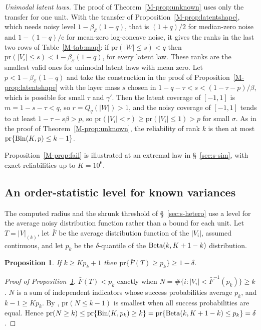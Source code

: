 \documentclass[11pt]{article}
\renewcommand{\_}{\usc\allowbreak}
\newtheorem{proposition}{Proposition}
\newcommand{\pr}{\mathrm{pr}}
\begin{document}
\emph{Unimodal latent laws.} The proof of Theorem~\ref{M-prop:unknown} uses only the transfer for one unit. With the transfer of Proposition~\ref{M-prop:latentshape}, which needs noisy level $1 - \beta_{\mathcal E}(1 - q)$, that is $(1 + q)/2$ for median-zero noise and $1 - (1 - q)/\mathrm{e}$ for mean-zero log-concave noise, it gives the ranks in the last two rows of Table~\ref{M-tab:map}: if $\pr(|W| \le s) < q$ then $\pr(|V_i| \le s) < 1 - \beta_{\mathcal E}(1 - q)$, for every latent law. These ranks are the smallest valid ones for unimodal latent laws with mean zero. Let $p < 1 - \beta_{\mathcal E}(1 - q)$ and take the construction in the proof of Proposition~\ref{M-prop:latentshape} with the layer mass $s$ chosen in $1 - q - \tau < s < (1 - \tau - p)/\beta$, which is possible for small $\tau$ and $\gamma'$. Then the latent coverage of $[-1, 1]$ is $m = 1 - s - \tau < q$, so $r = Q_q(|W|) > 1$, and the noisy coverage of $[-1, 1]$ tends to at least $1 - \tau - s\beta > p$, so $\pr(|V_i| < r) \ge \pr(|V_i| \le 1) > p$ for small $\sigma$. As in the proof of Theorem~\ref{M-prop:unknown}, the reliability of rank $k$ is then at most $\pr\{{\rm Bin}(K, p) \le k - 1\}$.

Proposition~\ref{M-prop:fail} is illustrated at an extremal law in \S~\ref{sec:s-sim}, with exact reliabilities up to $K = 10^6$.

\subsection*{An order-statistic level for known variances}

The computed radius and the shrunk threshold of \S~\ref{sec:s-hetero} use a level for the average noisy distribution function rather than a bound for each unit. Let $T = |V|_{(k)}$, let $\bar F$ be the average distribution function of the $|V_i|$, assumed continuous, and let $p_k$ be the $\delta$-quantile of the ${\rm Beta}(k, K+1-k)$ distribution.

\begin{proposition}\label{prop:beta}
If $k \ge Kp_k + 1$ then $\pr\{\bar F(T) \ge p_k\} \ge 1 - \delta$.
\end{proposition}

\begin{proof}[Proof of Proposition~\ref{prop:beta}]
$\bar F(T) < p_k$ exactly when $N = \#\{i : |V_i| < \bar F^{-1}(p_k)\} \ge k$. $N$ is a sum of independent indicators whose success probabilities average $p_k$, and $k - 1 \ge Kp_k$. By \citet{hoeffding1956}, $\pr(N \le k-1)$ is smallest when all success probabilities are equal. Hence $\pr(N \ge k) \le \pr\{{\rm Bin}(K, p_k) \ge k\} = \pr\{{\rm Beta}(k, K+1-k) \le p_k\} = \delta$.
\end{proof}
\end{document}
